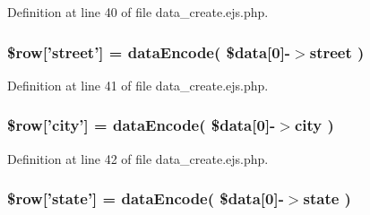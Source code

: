 \-Definition at line 40 of file data\-\_\-create.\-ejs.\-php.

\hypertarget{patientfile_2immnunization_2data__create_8ejs_8php_a7333deeacbe82dc6e01b7e9e86eb3e5a}{
\subsubsection[{\$row}]{\setlength{\rightskip}{0pt plus 5cm}\$row\mbox{[}'street'\mbox{]} = {\bf data\-Encode}( \$data\mbox{[}0\mbox{]}-\/$>$street )}}\label{patientfile_2immnunization_2data__create_8ejs_8php_a7333deeacbe82dc6e01b7e9e86eb3e5a}


\-Definition at line 41 of file data\-\_\-create.\-ejs.\-php.

\hypertarget{patientfile_2immnunization_2data__create_8ejs_8php_abc2948b74989328277b5513f9ba22e4e}{
\subsubsection[{\$row}]{\setlength{\rightskip}{0pt plus 5cm}\$row\mbox{[}'city'\mbox{]} = {\bf data\-Encode}( \$data\mbox{[}0\mbox{]}-\/$>$city )}}\label{patientfile_2immnunization_2data__create_8ejs_8php_abc2948b74989328277b5513f9ba22e4e}


\-Definition at line 42 of file data\-\_\-create.\-ejs.\-php.

\hypertarget{patientfile_2immnunization_2data__create_8ejs_8php_a652ce4ee989023692939900810b2a70a}{
\subsubsection[{\$row}]{\setlength{\rightskip}{0pt plus 5cm}\$row\mbox{[}'state'\mbox{]} = {\bf data\-Encode}( \$data\mbox{[}0\mbox{]}-\/$>$state )}}\label{patientfile_2immnunization_2data__create_8ejs_8php_a652ce4ee989023692939900810b2a70a}


